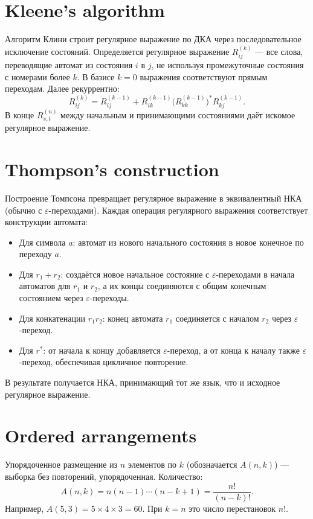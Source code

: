 \documentclass{article}
\begin{document}
	\section{Kleene’s algorithm}
	Алгоритм Клини строит регулярное выражение по ДКА через последовательное исключение состояний. Определяется регулярное выражение $R_{ij}^{(k)}$ --- все слова, переводящие автомат из состояния $i$ в $j$, не используя промежуточные состояния с номерами более $k$. В базисе $k=0$ выражения соответствуют прямым переходам. Далее рекуррентно:
	\[
	R_{ij}^{(k)} = R_{ij}^{(k-1)} + R_{ik}^{(k-1)} \bigl(R_{kk}^{(k-1)}\bigr)^* R_{kj}^{(k-1)}.
	\]
	В конце $R_{s,t}^{(n)}$ между начальным и принимающими состояниями даёт искомое регулярное выражение.
	
	\section{Thompson’s construction}
	Построение Томпсона превращает регулярное выражение в эквивалентный НКА (обычно с $\varepsilon$-переходами). Каждая операция регулярного выражения соответствует конструкции автомата:
	\begin{itemize}
		\item Для символа $a$: автомат из нового начального состояния в новое конечное по переходу $a$.
		\item Для $r_1 + r_2$: создаётся новое начальное состояние с $\varepsilon$-переходами в начала автоматов для $r_1$ и $r_2$, а их концы соединяются с общим конечным состоянием через $\varepsilon$-переходы.
		\item Для конкатенации $r_1 r_2$: конец автомата $r_1$ соединяется с началом $r_2$ через $\varepsilon$-переход.
		\item Для $r^*$: от начала к концу добавляется $\varepsilon$-переход, а от конца к началу также $\varepsilon$-переход, обеспечивая цикличное повторение.
	\end{itemize}
	В результате получается НКА, принимающий тот же язык, что и исходное регулярное выражение.
	
	\section{Ordered arrangements}
	Упорядоченное размещение из $n$ элементов по $k$ (обозначается $A(n,k)$) --- выборка без повторений, упорядоченная. Количество:
	\[
	A(n,k) = n(n-1)\cdots(n-k+1) = \frac{n!}{(n-k)!}.
	\]
	Например, $A(5,3) = 5\times4\times3 = 60$. При $k=n$ это число перестановок $n!$.
	
\end{document}
